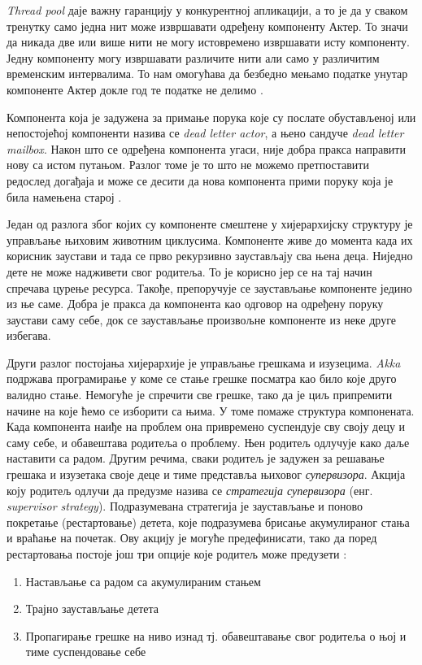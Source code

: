 \documentclass[12pt,oneside]{memoir}
\begin{document}
\textit{Thread pool} даје важну гаранцију у конкурентној апликацији, а то је да у сваком тренутку само једна нит може извршавати одређену компоненту Актер. То значи да никада две или више нити не могу истовремено извршавати исту компоненту. Једну компоненту могу извршавати различите нити али само у различитим временским интервалима. То нам омогућава да безбедно мењамо податке унутар компоненте Актер докле год те податке не делимо \cite{progInScala3, akkaDoc}. 
\par Компонента која је задужена за примање порука које су послате обустављеној или непостојећој компоненти назива се \textit{dead letter actor}, а њено сандуче \textit{dead letter mailbox}. Након што се одређена компонента угаси, није добра пракса направити нову са истом путањом. Разлог томе је то што не можемо претпоставити редослед догађаја и може се десити да нова компонента прими поруку која је била намењена старој \cite{akkaDoc}.
\par Један од разлога због којих су компоненте смештене у хијерархијску структуру је управљање њиховим животним циклусима. Компоненте живе до момента када их корисник заустави и тада се прво рекурзивно заустављају сва њена деца. Ниједно дете не може надживети свог родитеља. То је корисно јер се на тај начин спречава цурење ресурса. Такође, препоручује се заустављање компоненте једино из ње саме. Добра је пракса да компонента као одговор на одређену поруку заустави саму себе, док се заустављање произвољне компоненте из неке друге избегава.

Други разлог постојања хијерархије је управљање грешкама и изузецима. \textit{Akka} подржава програмирање у коме се стање грешке посматра као било које друго валидно стање. Немогуће је спречити све грешке, тако да је циљ припремити начине на које ћемо се изборити са њима. У томе помаже структура компонената. Када компонента наиђе на проблем она привремено суспендује сву своју децу и саму себе, и обавештава родитеља о проблему. Њен родитељ одлучује како даље наставити са радом. Другим речима, сваки родитељ је задужен за решавање грешака и изузетака своје деце и тиме представља њиховог \textit{супервизора}. Акција коју родитељ одлучи да предузме назива се \textit{стратегија супервизора} (енг. \textit{supervisor strategy}). Подразумевана стратегија је заустављање и поново покретање (рестартовање) детета, које подразумева брисање акумулираног стања и враћање на почетак. Ову акцију је могуће предефинисати, тако да поред рестартовања постоје још три опције које родитељ може предузети \cite{progInScala3, akkaDoc}:
\begin{enumerate}[1)]
\item Настављање са радом са акумулираним стањем
\item Трајно заустављање детета
\item Пропагирање грешке на ниво изнад тј. обавештавање свог родитеља о њој и тиме суспендовање себе
\end{enumerate}
\end{document}
